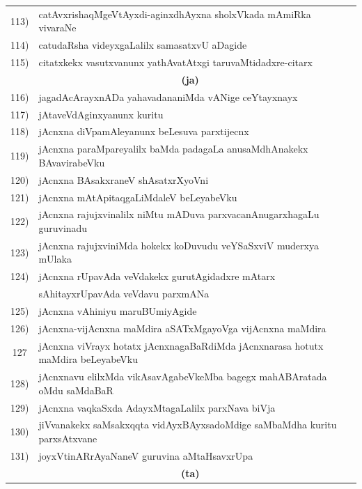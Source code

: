 {\begin{longtable}{@{}cp{7.4cm}r}
113) & catAvxrishaqMgeVtAyxdi-aginxdhAyxna sholxVkada mAmiRka vivaraNe &  \pageref{page209}\\
114) & catudaRsha videyxgaLalilx samasatxvU aDagide & \pageref{page197}\\
115) & citatxkekx vasutxvanunx yathAvatAtxgi taruvaMtidadxre-citarx & \pageref{page200}\\[0.3cm]
     &  \multicolumn{1}{c}{\textbf{(ja)}}  & \\[0.3cm]
116) & jagadAcArayxnADa yahavadananiMda vANige ceYtayxnayx &   \pageref{page128}\\
117) & jAtaveVdAginxyanunx kuritu & \pageref{page212}\\
118) & jAcnxna diVpamAleyanunx beLesuva parxtijecnx &   \pageref{page81}\\
119) & jAcnxna paraMpareyalilx baMda padagaLa anusaMdhAnakekx BAvavirabeVku & \pageref{page140}\\
120) & jAcnxna BAsakxraneV shAsatxrXyoVni & \pageref{page168}\\
121) & jAcnxna mAtApitaqgaLiMdaleV beLeyabeVku & \pageref{page68}\\
122) & jAcnxna rajujxvinalilx niMtu mADuva parxvacanAnugarxhagaLu guruvinadu & \pageref{page82}\\ 
123) & jAcnxna rajujxviniMda hokekx koDuvudu veYSaSxviV muderxya mUlaka & \pageref{page83}\\
124) & jAcnxna rUpavAda veVdakekx gurutAgidadxre mAtarx & \\
     & sAhitayxrUpavAda veVdavu parxmANa  & \pageref{page137}\\
125) & jAcnxna vAhiniyu maruBUmiyAgide & \pageref{page110}\\
126) & jAcnxna-vijAcnxna maMdira aSATxMgayoVga vijAcnxna maMdira & \pageref{page73}\\
127  & jAcnxna viVrayx hotatx jAcnxnagaBaRdiMda jAcnxnarasa hotutx maMdira beLeyabeVku & \pageref{page79}\\ 
128) & jAcnxnavu elilxMda vikAsavAgabeVkeMba bagegx mahABAratada oMdu saMdaBaR & \pageref{page162}\\
129) & jAcnxna vaqkaSxda AdayxMtagaLalilx parxNava biVja & \pageref{page138}\\
130) & jiVvanakekx saMsakxqqta vidAyxBAyxsadoMdige saMbaMdha kuritu parxsAtxvane & \pageref{page38}\\
131) & joyxVtinARrAyaNaneV guruvina aMtaHsavxrUpa & \pageref{page80}\\[0.3cm]
     &  \multicolumn{1}{c}{\textbf{(ta)}}  & \\[0.3cm]    

\end{longtable}}
